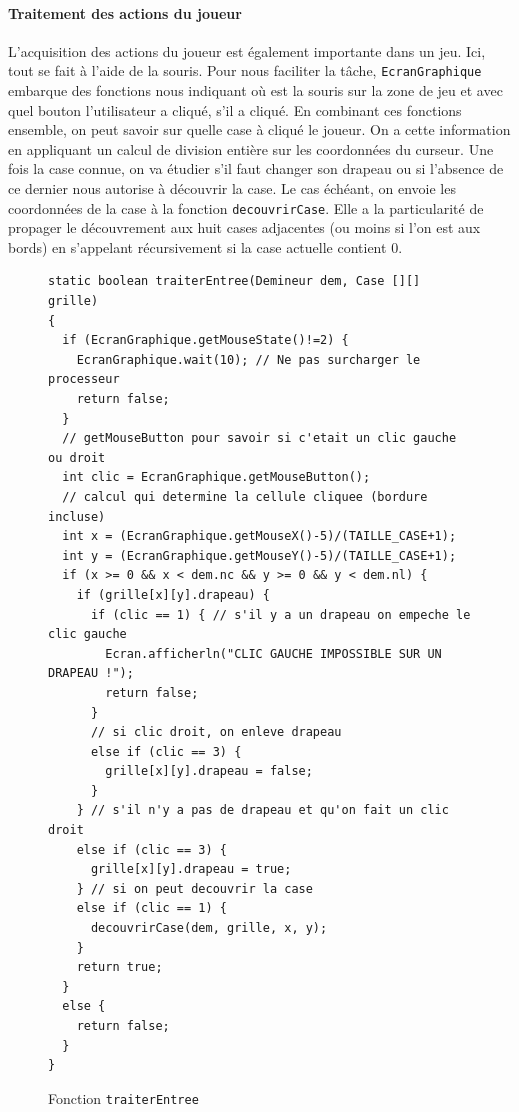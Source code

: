 \documentclass[a4paper, 12pt, oneside]{article}
\newcommand{\var}[1]{\texttt{#1}}
\begin{document}
\paragraph{Traitement des actions du joueur} L'acquisition des actions du joueur est également importante dans un jeu. Ici, tout se fait à l'aide de la souris. Pour nous faciliter la tâche, \var{EcranGraphique} embarque des fonctions nous indiquant où est la souris sur la zone de jeu et avec quel bouton l'utilisateur a cliqué, s'il a cliqué. En combinant ces fonctions ensemble, on peut savoir sur quelle case à cliqué le joueur. On a cette information en appliquant un calcul de division entière sur les coordonnées du curseur. Une fois la case connue, on va étudier s'il faut changer son drapeau ou si l'absence de ce dernier nous autorise à découvrir la case. Le cas échéant, on envoie les coordonnées de la case à la fonction \var{decouvrirCase}. Elle a la particularité de propager le découvrement aux huit cases adjacentes (ou moins si l'on est aux bords) en s'appelant récursivement si la case actuelle contient $0$.

\begin{figure}[hpt]
	\center
	\caption{\label{fig:fnTraiterEntree} Fonction \var{traiterEntree}}
\begin{lstlisting}
static boolean traiterEntree(Demineur dem, Case [][] grille)
{
  if (EcranGraphique.getMouseState()!=2) {
    EcranGraphique.wait(10); // Ne pas surcharger le processeur
    return false;
  }
  // getMouseButton pour savoir si c'etait un clic gauche ou droit
  int clic = EcranGraphique.getMouseButton();
  // calcul qui determine la cellule cliquee (bordure incluse)
  int x = (EcranGraphique.getMouseX()-5)/(TAILLE_CASE+1);
  int y = (EcranGraphique.getMouseY()-5)/(TAILLE_CASE+1);
  if (x >= 0 && x < dem.nc && y >= 0 && y < dem.nl) {
    if (grille[x][y].drapeau) {
      if (clic == 1) { // s'il y a un drapeau on empeche le clic gauche
        Ecran.afficherln("CLIC GAUCHE IMPOSSIBLE SUR UN DRAPEAU !");
        return false;
      }
      // si clic droit, on enleve drapeau
      else if (clic == 3) {
        grille[x][y].drapeau = false;
      }
    } // s'il n'y a pas de drapeau et qu'on fait un clic droit
    else if (clic == 3) {
      grille[x][y].drapeau = true;
    } // si on peut decouvrir la case
    else if (clic == 1) {
      decouvrirCase(dem, grille, x, y);
    }
    return true;
  }
  else {
    return false;
  }
}
\end{lstlisting}
\end{figure}
\end{document}
